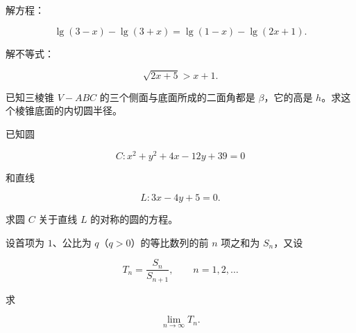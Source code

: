 \begin{question}
解方程：

\nopagebreak[4]
\[
\lg(3-x)-\lg(3+x)=\lg(1-x)-\lg(2x+1).
\]

\end{question}
\begin{question}
解不等式：

\nopagebreak[4]
\[
\sqrt{2x+5}>x+1.
\]

\end{question}
\begin{question}
已知三棱锥 $V-ABC$ 的三个侧面与底面所成的二面角都是 $\beta$，它的高是 $h$。求这个棱锥底面的内切圆半径。

\end{question}
\begin{question}
已知圆

\nopagebreak[4]
\[
C:x^2+y^2+4x-12y+39=0
\]

和直线

\nopagebreak[4]
\[
L:3x-4y+5=0.
\]

求圆 $C$ 关于直线 $L$ 的对称的圆的方程。

\end{question}
\begin{question}
设首项为 $1$、公比为 $q$（$q>0$）的等比数列的前 $n$ 项之和为 $S_n$，又设

\nopagebreak[4]
\[
T_n=\frac{S_n}{S_{n+1}},\qquad n=1,2,\ldots
\]

求

\nopagebreak[4]
\[
\lim_{n\to\infty}T_n.
\]

\end{question}